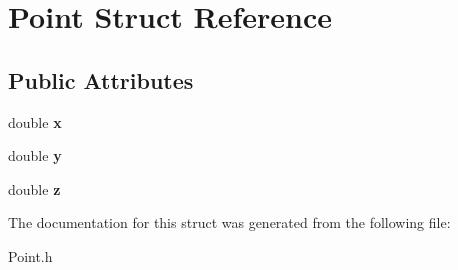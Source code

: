 \hypertarget{structPoint}{
\section{Point Struct Reference}
\label{structPoint}
}
\subsection*{Public Attributes}
\begin{DoxyCompactItemize}
\item 
\hypertarget{structPoint_ab99c56589bc8ad5fa5071387110a5bc7}{
double {\bfseries x}}
\label{structPoint_ab99c56589bc8ad5fa5071387110a5bc7}

\item 
\hypertarget{structPoint_afa38be143ae800e6ad69ce8ed4df62d8}{
double {\bfseries y}}
\label{structPoint_afa38be143ae800e6ad69ce8ed4df62d8}

\item 
\hypertarget{structPoint_a05ba3b1dfcb19430582ae953cbbfbded}{
double {\bfseries z}}
\label{structPoint_a05ba3b1dfcb19430582ae953cbbfbded}

\end{DoxyCompactItemize}


The documentation for this struct was generated from the following file:\begin{DoxyCompactItemize}
\item 
Point.h\end{DoxyCompactItemize}
